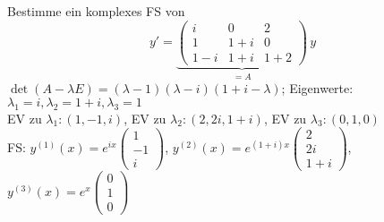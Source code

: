 \documentclass{article}
\begin{document}
\begin{beispiele} %
\item Bestimme ein komplexes FS von
$$y' = \underbrace{\begin{pmatrix}i & 0 & 2 \\ 1 & 1+i & 0 \\ 1-i & 1+i & 1+2\end{pmatrix}}_{=A}\,y$$
$\det(A-\lambda E) = (\lambda - 1)(\lambda - i)(1+i-\lambda)$; Eigenwerte: $\lambda_1 = i, \lambda_2 = 1+i, \lambda_3 = 1$ \\
EV zu $\lambda_1: (1,-1,i)$, EV zu $\lambda_2: (2, 2i, 1+i)$, EV zu $\lambda_3: (0, 1, 0)$ \\
FS: $y^{(1)}(x) = e ^{ix} \begin{pmatrix}1\\-1\\i\end{pmatrix}$, $y^{(2)}(x) = e ^{(1+i)x} \begin{pmatrix}2\\2i\\1+i\end{pmatrix}$, $y^{(3)}(x) = e ^{x} \begin{pmatrix}0\\1\\0\end{pmatrix}$


\end{beispiele}
\end{document}
